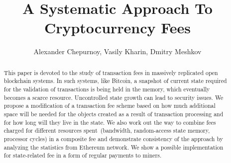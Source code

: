 \documentclass[]{llncs}   %
\begin{document}
\title{A Systematic Approach To Cryptocurrency Fees}

\author{Alexander Chepurnoy, Vasily Kharin, Dmitry Meshkov}


\maketitle

\begin{abstract}

This paper is devoted to the study of transaction fees in massively replicated
open blockchain systems. In such systems, like Bitcoin, a snapshot of current
state required for the validation of transactions is being held in the memory,
which eventually becomes a scarce resource.  Uncontrolled state growth can lead
to security issues.  We propose a modification of a transaction fee scheme
based on how much additional space will be needed for the objects created as a
result of transaction processing and for how long will they live in the state.
We also work out the way to combine fees charged for different resources
spent~(bandwidth, random-access state memory, processor cycles) in a composite
fee and demonstrate consistency of the approach by analyzing the statistics from
Ethereum network. We show a possible implementation for state-related fee in a
form of regular payments to miners.

\end{abstract}
\end{document}
